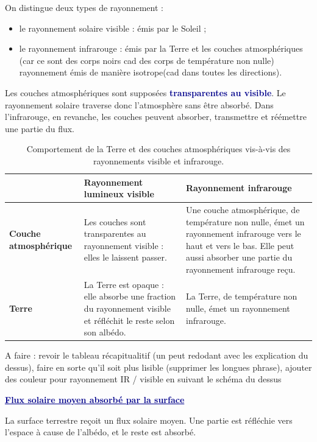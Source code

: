 \documentclass[11pt,a4paper]{article}
\newcommand{\motcle}[1]{\textcolor{DarkBlue}{\textbf{#1}}}
\newcommand{\bloc}[1]{\vspace{0.9em}\noindent\textcolor{DarkBlue}{\underline{\textbf{#1}}}\par\vspace{0.35em}}
\begin{document}
On distingue deux types de rayonnement :

\begin{itemize}
    \item le rayonnement solaire visible : émis par le Soleil ;
    \item le rayonnement infrarouge : émis par la Terre et les couches atmosphériques (car ce sont des corps noirs cad des corps de température non nulle) rayonnement émis de manière isotrope(cad dans toutes les directions).
\end{itemize}

Les couches atmosphériques sont supposées \motcle{transparentes au visible}. Le rayonnement solaire traverse donc l'atmosphère sans être absorbé. Dans l'infrarouge, en revanche, les couches peuvent absorber, transmettre et réémettre une partie du flux.

\renewcommand{\arraystretch}{1.35}
\begin{table}[H]
\centering
\begin{tabularx}{\textwidth}{>{\bfseries}p{3.2cm} X X}
\hline
 & Rayonnement lumineux visible & Rayonnement infrarouge \\
\hline
Couche atmosphérique
& Les couches sont transparentes au rayonnement visible : elles le laissent passer.
& Une couche atmosphérique, de température non nulle, émet un rayonnement infrarouge vers le haut et vers le bas. Elle peut aussi absorber une partie du rayonnement infrarouge reçu. \\
\hline
Terre
& La Terre est opaque : elle absorbe une fraction du rayonnement visible et réfléchit le reste selon son albédo.
& La Terre, de température non nulle, émet un rayonnement infrarouge. \\
\hline
\end{tabularx}
\caption{Comportement de la Terre et des couches atmosphériques vis-à-vis des rayonnements visible et infrarouge.}
\end{table}
\renewcommand{\arraystretch}{1}

\textcolor{green!50!black}{A faire : revoir le tableau récapitualitif (un peut redodant avec les explication du dessus), faire en sorte qu'il soit plus lisible (supprimer les longues phrase), ajouter des couleur pour rayonnement IR / visible en suivant le schéma du dessus}

\bloc{Flux solaire moyen absorbé par la surface}

La surface terrestre reçoit un flux solaire moyen. Une partie est réfléchie vers l'espace à cause de l'albédo, et le reste est absorbé.
\end{document}
